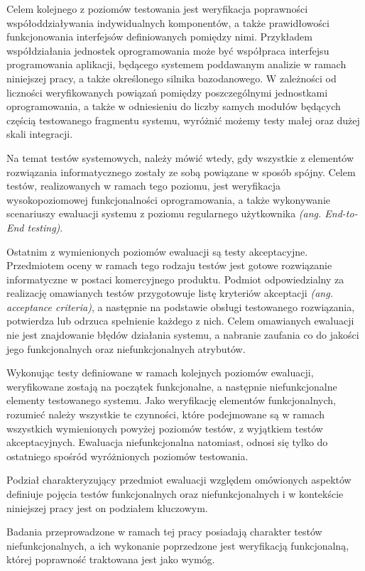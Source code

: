 Celem kolejnego z poziomów testowania jest weryfikacja poprawności współoddziaływania indywidualnych komponentów, a także prawidłowości funkcjonowania interfejsów definiowanych pomiędzy nimi. Przykładem współdziałania jednostek oprogramowania może być współpraca interfejsu programowania aplikacji, będącego systemem poddawanym analizie w ramach niniejszej pracy, a także określonego silnika bazodanowego. W zależności od liczności weryfikowanych powiązań pomiędzy poszczególnymi jednostkami oprogramowania, a także w odniesieniu do liczby samych modułów będących częścią testowanego fragmentu systemu, wyróżnić możemy testy małej oraz dużej skali integracji.

Na temat testów systemowych, należy mówić wtedy, gdy wszystkie z elementów rozwiązania informatycznego zostały ze sobą powiązane w sposób spójny. Celem testów, realizowanych w ramach tego poziomu, jest weryfikacja wysokopoziomowej funkcjonalności oprogramowania, a także wykonywanie scenariuszy ewaluacji systemu z poziomu regularnego użytkownika \textit{(ang. End-to-End testing)}.

Ostatnim z wymienionych poziomów ewaluacji są testy akceptacyjne. Przedmiotem oceny w ramach tego rodzaju testów jest gotowe rozwiązanie informatyczne w postaci komercyjnego produktu. Podmiot odpowiedzialny za realizację omawianych testów przygotowuje listę kryteriów akceptacji \textit{(ang. acceptance criteria)}, a następnie na podstawie obsługi testowanego rozwiązania, potwierdza lub odrzuca spełnienie każdego z nich. Celem omawianych ewaluacji nie jest znajdowanie błędów działania systemu, a nabranie zaufania co do jakości jego funkcjonalnych oraz niefunkcjonalnych atrybutów.

Wykonując testy definiowane w ramach kolejnych poziomów ewaluacji, weryfikowane zostają na początek funkcjonalne, a następnie niefunkcjonalne elementy testowanego systemu. Jako weryfikację elementów funkcjonalnych, rozumieć należy wszystkie te czynności, które podejmowane są w ramach wszystkich wymienionych powyżej poziomów testów, z wyjątkiem testów akceptacyjnych. Ewaluacja niefunkcjonalna natomiast, odnosi się tylko do ostatniego spośród wyróżnionych poziomów testowania.

Podział charakteryzujący przedmiot ewaluacji względem omówionych aspektów definiuje pojęcia testów funkcjonalnych oraz niefunkcjonalnych i w kontekście niniejszej pracy jest on podziałem kluczowym.

Badania przeprowadzone w ramach tej pracy posiadają charakter testów niefunkcjonalnych, a ich wykonanie poprzedzone jest weryfikacją funkcjonalną, której poprawność traktowana jest jako wymóg.
